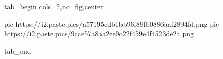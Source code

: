  
 
 
 
 


\ifcmt
  tab_begin cols=2,no_fig,center

     pic https://i2.paste.pics/a57195edb1bb96f89fb0886aaf2894fd.png
		 pic https://i2.paste.pics/9cce57a8aa2ee9c22f459e4f4523de2a.png

  tab_end
\fi
